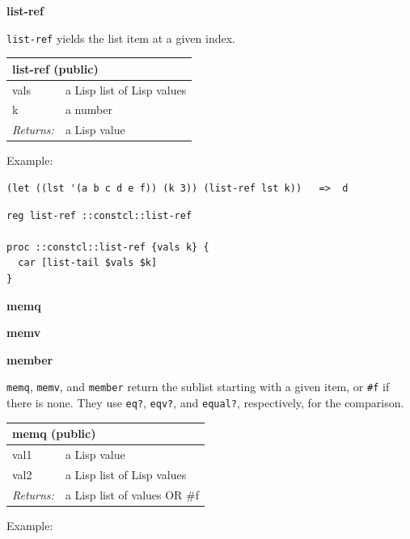 \documentclass[twoside,9pt]{report}
\begin{document}
\textbf{list-ref}


\texttt{list-ref} yields the list item at a given index.

\begin{tabular}{ |l l| }
\hline
\multicolumn{2}{|l|}{list-ref (public)} \\
\hline
vals & a Lisp list of Lisp values \\
k & a number \\
\textit{Returns:} & a Lisp value \\
\hline
\end{tabular}


Example:

\noindent\makebox[\linewidth]{\rule{\linewidth}{0.4pt}}
\begin{lstlisting}
(let ((lst '(a b c d e f)) (k 3)) (list-ref lst k))   =>  d
\end{lstlisting}
\noindent\makebox[\linewidth]{\rule{\linewidth}{0.4pt}}
\noindent\makebox[\linewidth]{\rule{\linewidth}{0.4pt}}
\begin{lstlisting}
reg list-ref ::constcl::list-ref
 
proc ::constcl::list-ref {vals k} {
  car [list-tail $vals $k]
}
\end{lstlisting}
\noindent\makebox[\linewidth]{\rule{\linewidth}{0.4pt}}

\textbf{memq}


\textbf{memv}


\textbf{member}


\texttt{memq}, \texttt{memv}, and \texttt{member} return the sublist starting with a given item, or \texttt{\#f} if there is none. They use \texttt{eq?}, \texttt{eqv?}, and \texttt{equal?}, respectively, for the comparison.

\begin{tabular}{ |l l| }
\hline
\multicolumn{2}{|l|}{memq (public)} \\
\hline
val1 & a Lisp value \\
val2 & a Lisp list of Lisp values \\
\textit{Returns:} & a Lisp list of values OR \#f \\
\hline
\end{tabular}


Example:
\end{document}
